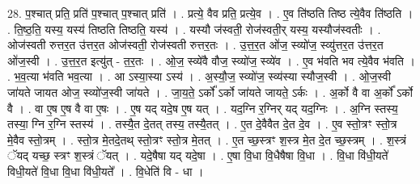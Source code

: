 \documentclass[17pt]{extarticle}
\begin{document}
28. प॒श्चात् प्रति॒ प्रति॑ प॒श्चात् प॒श्चात् प्रति॑ । . प्रत्ये॒ वैव प्रति॒ प्रत्ये॒व । . ए॒व ति॑ष्ठति तिष्ठ त्ये॒वैव ति॑ष्ठति । . ति॒ष्ठ॒ति॒ यस्य॒ यस्य॑ तिष्ठति तिष्ठति॒ यस्य॑ । . यस्यौ ज॑स्वती॒ रोज॑स्वती॒र् यस्य॒ यस्यौज॑स्वतीः । . ओज॑स्वती रुत्तर॒त उ॑त्तर॒त ओज॑स्वती॒ रोज॑स्वती रुत्तर॒तः । . उ॒त्त॒र॒त ओ॑ज॒ स्व्यो॑ज॒ स्व्यु॑त्तर॒त उ॑त्तर॒त ओ॑ज॒स्वी । . उ॒त्त॒र॒त इत्यु॑त् - त॒र॒तः । . ओ॒ज॒ स्व्ये॑वै वौज॒ स्व्यो॑ज॒ स्व्ये॑व । . ए॒व भ॑वति भव त्ये॒वैव भ॑वति । . भ॒व॒त्या भ॑वति भव॒त्या । . आ ऽस्या॒स्या ऽस्य॑ । . अ॒स्यौ॒ज॒ स्व्यो॑ज॒ स्व्य॑स्या स्यौज॒स्वी । . ओ॒ज॒स्वी जा॑यते जायत ओज॒ स्व्यो॑ज॒स्वी जा॑यते । . जा॒य॒ते॒ ऽर्को᳚ ऽर्को जा॑यते जायते॒ ऽर्कः । . अ॒र्को वै वा अ॒र्को᳚ ऽर्को वै । . वा ए॒ष ए॒ष वै वा ए॒षः । . ए॒ष यद् यदे॒ष ए॒ष यत् । . यद॒ग्नि र॒ग्निर् यद् यद॒ग्निः । . अ॒ग्नि स्तस्य॒ तस्या॒ ग्नि र॒ग्नि स्तस्य॑ । . तस्यै॒त दे॒तत् तस्य॒ तस्यै॒तत् । . ए॒त दे॒वैवैत दे॒त दे॒व । . ए॒व स्तो॒त्रꣳ स्तो॒त्र मे॒वैव स्तो॒त्रम् । . स्तो॒त्र मे॒तदे॒तथ् स्तो॒त्रꣳ स्तो॒त्र मे॒तत् । . ए॒त च्छ॒स्त्रꣳ श॒स्त्र मे॒त दे॒त च्छ॒स्त्रम् । . श॒स्त्रं ॅयद् यच्छ॒ स्त्रꣳ श॒स्त्रं ॅयत् । . यदे॒षैषा यद् यदे॒षा । . ए॒षा वि॒धा वि॒धैषैषा वि॒धा । . वि॒धा वि॑धी॒यते॑ विधी॒यते॑ वि॒धा वि॒धा वि॑धी॒यते᳚ । . वि॒धेति॑ वि - धा । \newline
\end{document}
